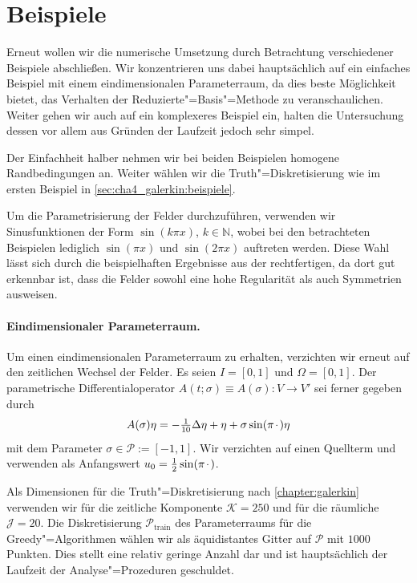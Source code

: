 \documentclass[../main.tex]{subfiles}
\begin{document}
\section{Beispiele} %
\label{sec:cha5_rbm:beispiele}

Erneut wollen wir die numerische Umsetzung durch Betrachtung verschiedener Beispiele abschließen.
Wir konzentrieren uns dabei hauptsächlich auf ein einfaches Beispiel mit einem eindimensionalen Parameterraum, da dies beste Möglichkeit bietet, das Verhalten der Reduzierte"=Basis"=Methode zu veranschaulichen.
Weiter gehen wir auch auf ein komplexeres Beispiel ein, halten die Untersuchung dessen vor allem aus Gründen der Laufzeit jedoch sehr simpel.

Der Einfachheit halber nehmen wir bei beiden Beispielen homogene Randbedingungen an.
Weiter wählen wir die Truth"=Diskretisierung wie im ersten Beispiel in \cref{sec:cha4_galerkin:beispiele}.

Um die Parametrisierung der Felder durchzuführen, verwenden wir Sinusfunktionen der Form $\sin(k \pi x)$, $k \in \mathbb{N}$, wobei bei den betrachteten Beispielen lediglich $\sin(\pi x)$ und $\sin(2 \pi x)$ auftreten werden.
Diese Wahl lässt sich durch die beispielhaften Ergebnisse aus der  rechtfertigen, da dort gut erkennbar ist, dass die Felder sowohl eine hohe Regularität als auch Symmetrien ausweisen.

\paragraph{Eindimensionaler Parameterraum.} %

Um einen eindimensionalen Parameterraum zu erhalten, verzichten wir erneut auf den zeitlichen Wechsel der Felder.
Es seien $I = [0, 1]$ und $\Omega = [0, 1]$.
Der parametrische Differentialoperator $A(t; \sigma) \equiv A(\sigma) \colon V \to V'$ sei ferner gegeben durch
\begin{equation}
    A(\sigma) \eta = - \tfrac{1}{10} \Delta \eta + \eta + \sigma \sin(\pi {\mkern2mu\cdot\mkern2mu}) \eta
\end{equation}
mit dem Parameter $\sigma \in \mathcal P := [-1, 1]$.
Wir verzichten auf einen Quellterm und verwenden als Anfangswert $u_{0} = \tfrac{1}{2} \sin(\pi {\mkern2mu\cdot\mkern2mu})$.

Als Dimensionen für die Truth"=Diskretisierung nach \cref{chapter:galerkin} verwenden wir für die zeitliche Komponente $\mathcal K = 250$ und für die räumliche $\mathcal J = 20$.
Die Diskretisierung $\mathcal P_{\mathrm{train}}$ des Parameterraums für die Greedy"=Algorithmen wählen wir als äquidistantes Gitter auf $\mathcal P$ mit $1000$ Punkten.
Dies stellt eine relativ geringe Anzahl dar und ist hauptsächlich der Laufzeit der Analyse"=Prozeduren geschuldet.
\end{document}
